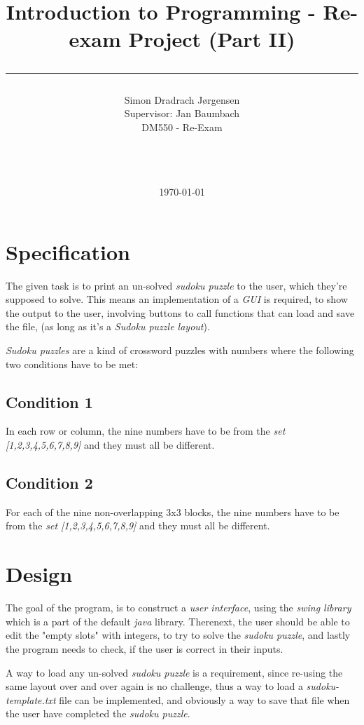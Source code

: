 \documentclass[a4paper,10pt]{article}
\title{Introduction to Programming - Re-exam Project (Part II)\\\rule{10cm}{0.5mm}}
\author{Simon Dradrach Jørgensen 
\\Supervisor: Jan Baumbach\\ DM550 - Re-Exam\\\rule{5.5cm}{0.5mm}\\}
\date{\today}
\begin{document}
\maketitle

\vfill

\tableofcontents

\newpage
\section{Specification} 
The given task is to print an un-solved \textit{sudoku puzzle} to the user, which they're supposed to solve. This means an implementation of a \textit{GUI} is required, to show the output to the user, involving buttons to call functions that can load and save the file, (as long as it's a \textit{Sudoku puzzle layout}).

\textit{Sudoku puzzles} are a kind of crossword puzzles with numbers where the following two conditions have to be met: \cite{1}

\subsection{Condition 1} 
In each row or column, the nine numbers have to be from the \textit{set [1,2,3,4,5,6,7,8,9]} and they must all be different.

\subsection{Condition 2} 
For each of the nine non-overlapping 3x3 blocks, the nine numbers have to be from the \textit{set [1,2,3,4,5,6,7,8,9]} and they must all be different.

\section{Design}
The goal of the program, is to construct a \textit{user interface}, using the \textit{swing library} which is a part of the default \textit{java} library. Therenext, the user should be able to edit the "empty slots" with integers, to try to solve the \textit{sudoku puzzle}, and lastly the program needs to check, if the user is correct in their inputs.

A way to load any un-solved \textit{sudoku puzzle} is a requirement, since re-using the same layout over and over again is no challenge, thus a way to load a \textit{sudoku-template.txt} file can be implemented, and obviously a way to save that file when the user have completed the \textit{sudoku puzzle}. 
\end{document}
